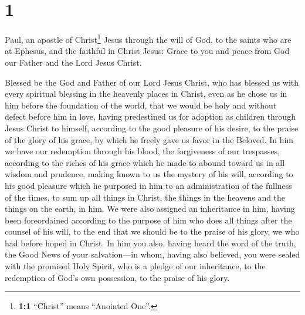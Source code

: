 \hypertarget{section}{%
\section{1}\label{section}}

 Paul, an apostle of Christ\footnote{\textbf{1:1}
  ``Christ'' means ``Anointed One''.} Jesus through the will of God, to
the saints who are at Ephesus, and the faithful in Christ Jesus:
 Grace to you and peace from God our Father and the Lord
Jesus Christ.

 Blessed be the God and Father of our Lord Jesus Christ,
who has blessed us with every spiritual blessing in the heavenly places
in Christ,  even as he chose us in him before the
foundation of the world, that we would be holy and without defect before
him in love,  having predestined us for adoption as
children through Jesus Christ to himself, according to the good pleasure
of his desire,  to the praise of the glory of his grace,
by which he freely gave us favor in the Beloved.  In him
we have our redemption through his blood, the forgiveness of our
trespasses, according to the riches of his grace  which he
made to abound toward us in all wisdom and prudence, 
making known to us the mystery of his will, according to his good
pleasure which he purposed in him  to an administration
of the fullness of the times, to sum up all things in Christ, the things
in the heavens and the things on the earth, in him.  We
were also assigned an inheritance in him, having been foreordained
according to the purpose of him who does all things after the counsel of
his will,  to the end that we should be to the praise of
his glory, we who had before hoped in Christ.  In him you
also, having heard the word of the truth, the Good News of your
salvation---in whom, having also believed, you were sealed with the
promised Holy Spirit,  who is a pledge of our
inheritance, to the redemption of God's own possession, to the praise of
his glory.

